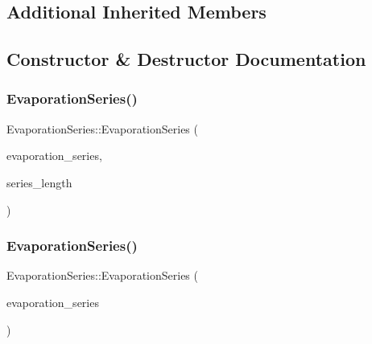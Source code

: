 \subsection*{Additional Inherited Members}


\subsection{Constructor \& Destructor Documentation}
\mbox{\label{classEvaporationSeries_af0903d8555a148f9bf45f915877120b3_af0903d8555a148f9bf45f915877120b3}} 
\subsubsection{\texorpdfstring{Evaporation\+Series()}{EvaporationSeries()}\hspace{0.1cm}{\footnotesize\ttfamily [1/2]}}
{\footnotesize\ttfamily Evaporation\+Series\+::\+Evaporation\+Series (\begin{DoxyParamCaption}\item[{vector$<$ vector$<$ double $>$$>$ $\ast$}]{evaporation\+\_\+series,  }\item[{int}]{series\+\_\+length }\end{DoxyParamCaption})}

\mbox{\label{classEvaporationSeries_aa8d8cd8bbc0fd5b368b748cb090ad414_aa8d8cd8bbc0fd5b368b748cb090ad414}} 
\subsubsection{\texorpdfstring{Evaporation\+Series()}{EvaporationSeries()}\hspace{0.1cm}{\footnotesize\ttfamily [2/2]}}
{\footnotesize\ttfamily Evaporation\+Series\+::\+Evaporation\+Series (\begin{DoxyParamCaption}\item[{const \mbox{\hyperlink{classEvaporationSeries}{Evaporation\+Series}} \&}]{evaporation\+\_\+series }\end{DoxyParamCaption})}

